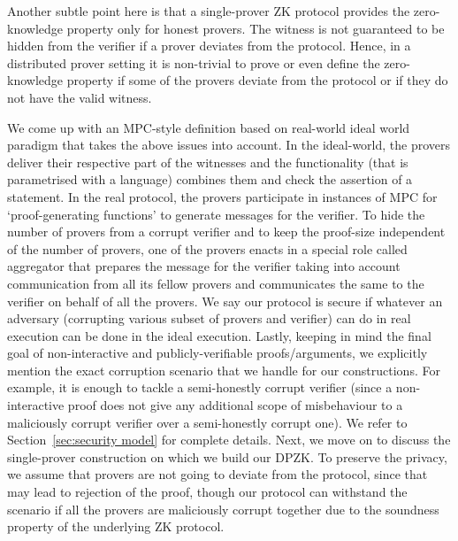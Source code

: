Another subtle point here is that a single-prover ZK protocol provides the zero-knowledge property only for honest provers. The witness is not guaranteed to be hidden from the verifier if a prover deviates from the protocol. Hence, in a distributed prover setting it is non-trivial to prove or even define the zero-knowledge property if some of the provers deviate from the protocol or if they do not have the valid witness. 

We come up with an MPC-style definition based on real-world ideal world paradigm \cite{Canetti00,Goldreich2001,Lindell17,CohenL14}  that takes the above issues into account. In the ideal-world, the provers deliver their respective part of the witnesses and the functionality (that is parametrised with a language) combines them and check the assertion of a statement. In the real protocol,  the provers participate in  instances of MPC for `proof-generating functions' to generate messages for the verifier. To hide the number of provers from a corrupt verifier and to keep the proof-size  independent of the number of provers, one of the provers enacts in a special role called aggregator   that prepares the message for the verifier taking into account communication from all its fellow provers and communicates the same to the verifier on behalf of all the provers. We say our protocol is secure if whatever an adversary (corrupting various subset of provers and verifier) can do in real execution can be done in the ideal execution. Lastly, keeping in mind the final goal of non-interactive and publicly-verifiable proofs/arguments, we explicitly mention the exact corruption scenario that we handle for our constructions.  For example, it is enough to tackle a semi-honestly corrupt verifier (since a non-interactive proof does not give any additional scope of misbehaviour to a maliciously corrupt verifier  over a semi-honestly corrupt one).  We refer to Section~\ref{sec:security model} for complete details. Next, we move on to discuss the single-prover construction on which we build our DPZK. 
To preserve the privacy, we assume that provers are not going to deviate from the protocol, since that may lead to rejection of the proof, though our protocol can withstand the scenario if all the provers are maliciously corrupt together due to the soundness property of the underlying ZK protocol.%

